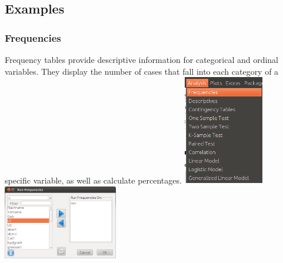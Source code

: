 \documentclass[xcolor={table}]{beamer}
\begin{document}
\subsection{Examples}
\begin{frame}\frametitle{Frequencies}
Frequency tables provide descriptive information for categorical and ordinal variables. They display the number of cases that fall into each category of a specific variable, as well as calculate percentages. 
\includegraphics[width=3.5cm]{frequ1.png} \hspace*{1cm} \includegraphics[width=5cm]{frequ2.png}
\end{frame}
\end{document}
